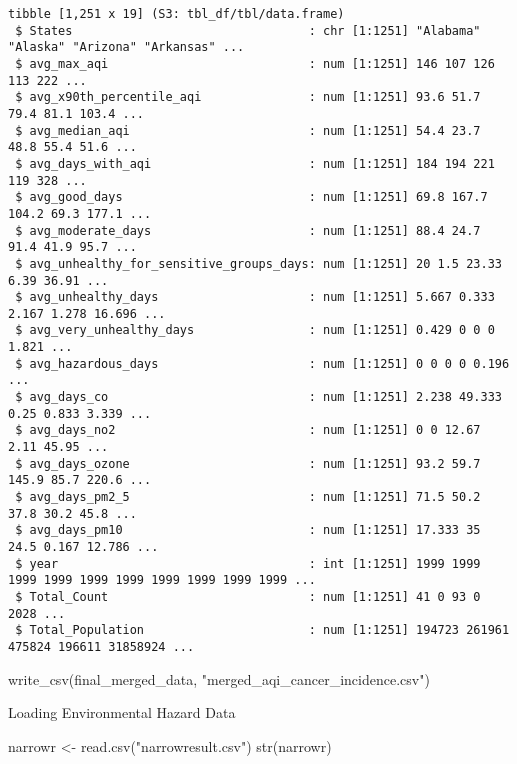 \documentclass[
  12pt,
]{article}
\newenvironment{Shaded}{\begin{snugshade}}{\end{snugshade}}
\newcommand{\FunctionTok}[1]{\textcolor[rgb]{0.28,0.35,0.67}{#1}}
\newcommand{\NormalTok}[1]{\textcolor[rgb]{0.00,0.23,0.31}{#1}}
\newcommand{\OtherTok}[1]{\textcolor[rgb]{0.00,0.23,0.31}{#1}}
\newcommand{\StringTok}[1]{\textcolor[rgb]{0.13,0.47,0.30}{#1}}
\begin{document}
\begin{verbatim}
tibble [1,251 x 19] (S3: tbl_df/tbl/data.frame)
 $ States                                 : chr [1:1251] "Alabama" "Alaska" "Arizona" "Arkansas" ...
 $ avg_max_aqi                            : num [1:1251] 146 107 126 113 222 ...
 $ avg_x90th_percentile_aqi               : num [1:1251] 93.6 51.7 79.4 81.1 103.4 ...
 $ avg_median_aqi                         : num [1:1251] 54.4 23.7 48.8 55.4 51.6 ...
 $ avg_days_with_aqi                      : num [1:1251] 184 194 221 119 328 ...
 $ avg_good_days                          : num [1:1251] 69.8 167.7 104.2 69.3 177.1 ...
 $ avg_moderate_days                      : num [1:1251] 88.4 24.7 91.4 41.9 95.7 ...
 $ avg_unhealthy_for_sensitive_groups_days: num [1:1251] 20 1.5 23.33 6.39 36.91 ...
 $ avg_unhealthy_days                     : num [1:1251] 5.667 0.333 2.167 1.278 16.696 ...
 $ avg_very_unhealthy_days                : num [1:1251] 0.429 0 0 0 1.821 ...
 $ avg_hazardous_days                     : num [1:1251] 0 0 0 0 0.196 ...
 $ avg_days_co                            : num [1:1251] 2.238 49.333 0.25 0.833 3.339 ...
 $ avg_days_no2                           : num [1:1251] 0 0 12.67 2.11 45.95 ...
 $ avg_days_ozone                         : num [1:1251] 93.2 59.7 145.9 85.7 220.6 ...
 $ avg_days_pm2_5                         : num [1:1251] 71.5 50.2 37.8 30.2 45.8 ...
 $ avg_days_pm10                          : num [1:1251] 17.333 35 24.5 0.167 12.786 ...
 $ year                                   : int [1:1251] 1999 1999 1999 1999 1999 1999 1999 1999 1999 1999 ...
 $ Total_Count                            : num [1:1251] 41 0 93 0 2028 ...
 $ Total_Population                       : num [1:1251] 194723 261961 475824 196611 31858924 ...
\end{verbatim}

\begin{Shaded}
\begin{Highlighting}[]
\FunctionTok{write\_csv}\NormalTok{(final\_merged\_data, }\StringTok{"merged\_aqi\_cancer\_incidence.csv"}\NormalTok{)}
\end{Highlighting}
\end{Shaded}

Loading Environmental Hazard Data

\begin{Shaded}
\begin{Highlighting}[]
\NormalTok{narrowr }\OtherTok{\textless{}{-}} \FunctionTok{read.csv}\NormalTok{(}\StringTok{"narrowresult.csv"}\NormalTok{)}
\FunctionTok{str}\NormalTok{(narrowr)}
\end{Highlighting}
\end{Shaded}
\end{document}
